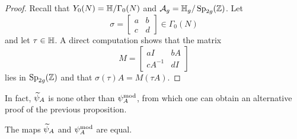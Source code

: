 \documentclass{amsart}
\begin{document}
\begin{proof}
Recall that $Y_0(N) = \mathbb{H}/\Gamma_0(N)$ and $\mathcal{A}_g = \mathbb{H}_g/\operatorname{Sp}_{2g}(\mathbb{Z})$. Let 
\[
\sigma = \begin{bmatrix} a & b \\ c & d \end{bmatrix} \in \Gamma_0(N)
\]
and let $\tau \in \mathbb{H}$. A direct computation shows that the matrix 
\[
M = \begin{bmatrix} aI & bA \\ cA^{-1} & dI \end{bmatrix}
\]
lies in $\operatorname{Sp}_{2g}(\mathbb{Z})$
and that $\sigma(\tau)A = M(\tau A)$.
\end{proof}

In fact, $\widetilde{\psi}_{A}$ is none other than $\psi_{A}^\mathrm{mod}$, from which one can obtain an alternative proof of the previous proposition.
\begin{proposition}
  The maps $\widetilde{\psi}_{A}$ and $\psi_{A}^\mathrm{mod}$ are equal.
\end{proposition}
\end{document}
